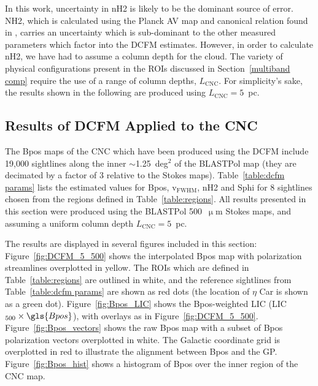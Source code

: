 In this work, uncertainty in \gls{nH2} is likely to be the dominant source of error. \gls{NH2}, which is calculated using the Planck \gls{AV} map and canonical relation found in \citet{bohlin224savage}, carries an uncertainty which is sub-dominant to the other measured parameters which factor into the DCFM estimates. However, in order to calculate \gls{nH2}, we have had to assume a column depth for the cloud. The variety of physical configurations present in the ROIs discussed in Section~\ref{multiband comp} require the use of a range of column depths, $L_{\mathrm{CNC}}$. For simplicity's sake, the results shown in the following are produced using $L_{\mathrm{CNC}} = 5$~pc.

\subsection{Results of DCFM Applied to the CNC}\label{Bpos estimates}

The \gls{Bpos} maps of the CNC which have been produced using the DCFM include 19,000 sightlines along the inner $\sim$1.25~deg$^{2}$ of the BLASTPol map (they are decimated by a factor of 3 relative to the Stokes maps). Table~\ref{table:dcfm params} lists the estimated values for \gls{Bpos}, v$_{\mathrm{FWHM}}$, \gls{nH2} and \gls{Sphi} for 8 sightlines chosen from the regions defined in Table~\ref{table:regions}. All results presented in this section were produced using the BLASTPol 500~$\upmu$m Stokes maps, and assuming a uniform column depth $L_{\mathrm{CNC}} = 5$~pc.

The results are displayed in several figures included in this section: Figure~\ref{fig:DCFM_5_500} shows the interpolated \gls{Bpos} map with polarization streamlines overplotted in yellow. The ROIs which are defined in Table~\ref{table:regions} are outlined in white, and the reference sightlines from Table~\ref{table:dcfm params} are shown as red dots (the location of $\eta$ Car is shown as a green dot). Figure~\ref{fig:Bpos_LIC} shows the \gls{Bpos}-weighted LIC (LIC$_{500} \times \gls{Bpos}$), with overlays as in Figure~\ref{fig:DCFM_5_500}. Figure~\ref{fig:Bpos_vectors} shows the raw \gls{Bpos} map with a subset of \gls{Bpos} polarization vectors overplotted in white. The Galactic coordinate grid is overplotted in red to illustrate the alignment between \gls{Bpos} and the GP\@. Figure~\ref{fig:Bpos_hist} shows a histogram of \gls{Bpos} over the inner region of the CNC map.

